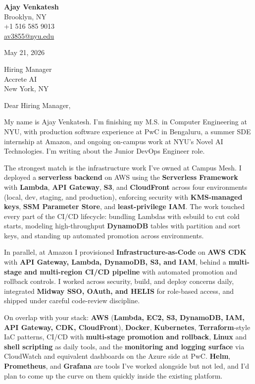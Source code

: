 \documentclass[letterpaper,11pt]{article}
\begin{document}
\begin{flushleft}
\textbf{\large Ajay Venkatesh} \\
Brooklyn, NY \\
+1 516 585 9013 \\
\href{mailto:av3855@nyu.edu}{av3855@nyu.edu}
\end{flushleft}
\vspace{10pt}
May 21, 2026
\vspace{6pt}

Hiring Manager \\
Accrete AI \\
New York, NY

\vspace{10pt}

Dear Hiring Manager,

My name is Ajay Venkatesh. I'm finishing my M.S. in Computer Engineering at NYU, with production software experience at PwC in Bengaluru, a summer SDE internship at Amazon, and ongoing on-campus work at NYU's Novel AI Technologies. I'm writing about the Junior DevOps Engineer role.

The strongest match is the infrastructure work I've owned at Campus Mesh. I deployed a \textbf{serverless backend} on AWS using the \textbf{Serverless Framework} with \textbf{Lambda}, \textbf{API Gateway}, \textbf{S3}, and \textbf{CloudFront} across four environments (local, dev, staging, and production), enforcing security with \textbf{KMS-managed keys}, \textbf{SSM Parameter Store}, and \textbf{least-privilege IAM}. The work touched every part of the CI/CD lifecycle: bundling Lambdas with esbuild to cut cold starts, modeling high-throughput \textbf{DynamoDB} tables with partition and sort keys, and standing up automated promotion across environments.

In parallel, at Amazon I provisioned \textbf{Infrastructure-as-Code} on \textbf{AWS CDK} with \textbf{API Gateway, Lambda, DynamoDB, S3, and IAM}, behind a \textbf{multi-stage and multi-region CI/CD pipeline} with automated promotion and rollback controls. I worked across security, build, and deploy concerns daily, integrated \textbf{Midway SSO, OAuth, and HELIS} for role-based access, and shipped under careful code-review discipline.

On overlap with your stack: \textbf{AWS} (\textbf{Lambda, EC2, S3, DynamoDB, IAM, API Gateway, CDK, CloudFront}), \textbf{Docker}, \textbf{Kubernetes}, \textbf{Terraform}-style IaC patterns, CI/CD with \textbf{multi-stage promotion and rollback}, \textbf{Linux} and \textbf{shell scripting} as daily tools, and the \textbf{monitoring and logging surface} via CloudWatch and equivalent dashboards on the Azure side at PwC. \textbf{Helm}, \textbf{Prometheus}, and \textbf{Grafana} are tools I've worked alongside but not led, and I'd plan to come up the curve on them quickly inside the existing platform.
\end{document}
